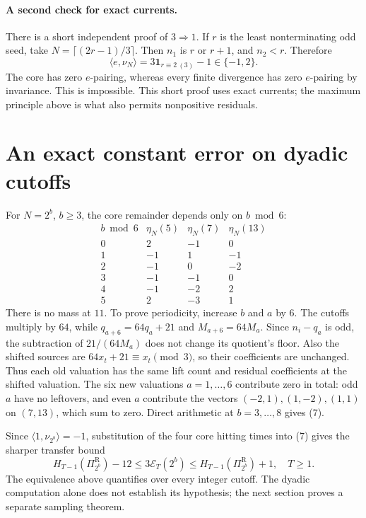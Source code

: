 \documentclass[11pt]{article}
\newcommand{\PiR}{\Pi^{\mathrm R}}
\begin{document}
\paragraph{A second check for exact currents.}
There is a short independent proof of $3\Rightarrow1$. If $r$ is the least
nonterminating odd seed, take $N=\lceil(2r-1)/3\rceil$. Then $n_1$ is $r$
or $r+1$, and $n_2<r$. Therefore
\[
\langle e,\nu_N\rangle=3\mathbf1_{r\equiv2\ (3)}-1\in\{-1,2\}.
\]
The core has zero $e$-pairing, whereas every finite divergence has zero
$e$-pairing by invariance. This is impossible. This short proof uses exact
currents; the maximum principle above is what also permits nonpositive residuals.

\section{An exact constant error on dyadic cutoffs}
For $N=2^b$, $b\ge3$, the core remainder depends only on $b\bmod6$:
\[
\begin{array}{c|rrr}
b\bmod6&\eta_N(5)&\eta_N(7)&\eta_N(13)\\\hline
0&2&-1&0\\
1&-1&1&-1\\
2&-1&0&-2\\
3&-1&-1&0\\
4&-1&-2&2\\
5&2&-3&1
\end{array}                                                   \tag{7}
\]
There is no mass at $11$. To prove periodicity, increase $b$ and $a$ by $6$.
The cutoffs multiply by $64$, while $q_{a+6}=64q_a+21$ and
$M_{a+6}=64M_a$. Since $n_i-q_a$ is odd, the subtraction of
$21/(64M_a)$ does not change its quotient's floor. Also the shifted sources
are $64x_t+21\equiv x_t\pmod3$, so their coefficients are unchanged.
Thus each old valuation has the same lift count and residual coefficients
at the shifted valuation.
The six new valuations $a=1,\ldots,6$ contribute zero in total: odd $a$ have
no leftovers, and even $a$ contribute the vectors $(-2,1),(1,-2),(1,1)$
on $(7,13)$, which sum to zero. Direct arithmetic at $b=3,\ldots,8$ gives (7).

Since $\langle1,\nu_{2^b}\rangle=-1$, substitution of the four core hitting
times into (7) gives the sharper transfer bound
\[
\boxed{\quad
H_{T-1}(\PiR_{2^b})-12\le3\mathcal E_T(2^b)
\le H_{T-1}(\PiR_{2^b})+1,\quad T\ge1.
\quad}                                                       \tag{8}
\]
The equivalence above quantifies over every integer cutoff. The dyadic
computation alone does not establish its hypothesis; the next section proves
a separate sampling theorem.
\end{document}
